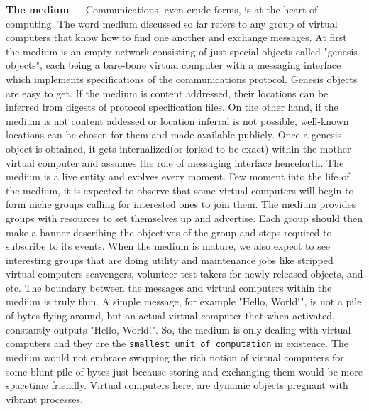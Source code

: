 \documentclass[a4paper, 10pt]{article}
\begin{document}
\textbf{The medium} --- Communications, even crude forms, is at the heart of computing. The word medium discussed so far refers to any group of virtual computers that know how to find one another and exchange messages. At first the medium is an empty network consisting of just special objects called "genesis objects", each being a bare-bone virtual computer with a messaging interface which implements specifications of the communications protocol. Genesis objects are easy to get. If the medium is content addressed, their locations can be inferred from digests of protocol specification files. On the other hand, if the medium is not content addessed or location inferral is not possible, well-known locations can be chosen for them and made available publicly. Once a genesis object is obtained, it gets internalized(or forked to be exact) within the mother virtual computer and assumes the role of messaging interface henceforth. The medium is a live entity and evolves every moment. Few moment into the life of the medium, it is expected to observe that some virtual computers will begin to form niche groups calling for interested ones to join them. The medium provides groups with resources to set themselves up and advertise. Each group should then make a banner describing the objectives of the group and steps required to subscribe to its events. When the medium is mature, we also expect to see interesting groups that are doing utility and maintenance jobs like stripped virtual computers scavengers, volunteer test takers for newly released objects, and etc. The boundary between the messages and virtual computers within the medium is truly thin. A simple message, for example "Hello, World!", is not a pile of bytes flying around, but an actual virtual computer that when activated, constantly outputs "Hello, World!". So, the medium is only dealing with virtual computers and they are the \texttt{smallest unit of computation} in existence. The medium would not embrace swapping the rich notion of virtual computers for some blunt pile of bytes just because storing and exchanging them would be more spacetime friendly. Virtual computers here, are dynamic objects pregnant with vibrant processes. 
\par
\end{document}
